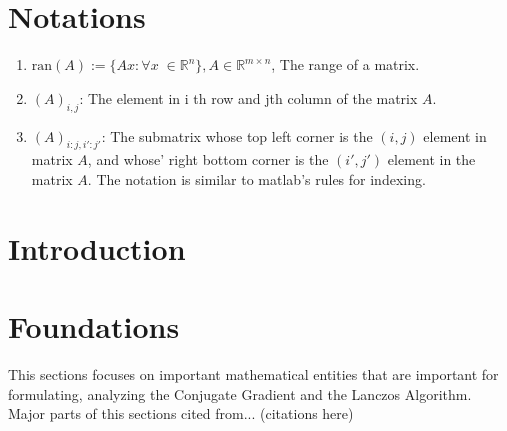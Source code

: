 \documentclass[]{article}
\theoremstyle{definition}
\begin{document}
\tableofcontents
\newpage
\section*{Notations}
\begin{enumerate}
    \item $\text{ran}(A):=\{Ax :\forall x \; \in \mathbb R^n\}, A \in \mathbb R^{m\times n}$, The range of a matrix. 
    \item $(A)_{i, j}$: The element in i th row and jth column of the matrix $A$.
    \item $(A)_{i:j, i':j'}$: The submatrix whose top left corner is the $(i, j)$ element in matrix $A$, and whose' right bottom corner is the $(i', j ')$ element in the matrix $A$. The notation is similar to matlab's rules for indexing. 
    
\end{enumerate}
\section*{Introduction}
\newpage
\section{Foundations}
    This sections focuses on important mathematical entities that are important for formulating, analyzing the Conjugate Gradient and the Lanczos Algorithm. Major parts of this sections cited from... (citations here)
\end{document}
